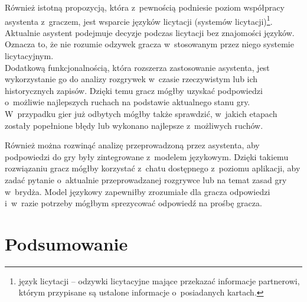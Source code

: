 Również istotną propozycją, która z~pewnością podniesie poziom
współpracy asystenta z~graczem, jest wsparcie języków licytacji (systemów licytacji)\footnote{
    język licytacji -- odzywki licytacyjne mające przekazać informacje
    partnerowi, którym przypisane
    są ustalone informacje o~posiadanych kartach.
}.
Aktualnie asystent podejmuje decyzje podczas licytacji bez znajomości
języków. Oznacza to, że nie rozumie odzywek gracza w~stosowanym przez
niego systemie licytacyjnym. \\

Dodatkową funkcjonalnością, która rozszerza zastosowanie asystenta, jest
wykorzystanie go do analizy rozgrywek w~czasie rzeczywistym lub
ich historycznych zapisów. Dzięki temu gracz mógłby uzyskać podpowiedzi
o~możliwie najlepszych ruchach na podstawie aktualnego stanu gry.
W~przypadku gier już odbytych mógłby także sprawdzić, w~jakich etapach
zostały popełnione błędy lub wykonano najlepsze z~możliwych ruchów.

Również można rozwinąć analizę przeprowadzoną przez asystenta, aby
podpowiedzi do gry były zintegrowane z~modelem językowym. Dzięki
takiemu rozwiązaniu gracz mógłby korzystać z~chatu dostępnego
z~poziomu aplikacji, aby zadać pytanie o~aktualnie przeprowadzanej
rozgrywce lub na temat zasad gry w~brydża. Model językowy zapewniłby
zrozumiałe dla gracza odpowiedzi i~w~razie potrzeby mógłbym sprezycować
odpowiedź na prośbę gracza.

\section{Podsumowanie}


